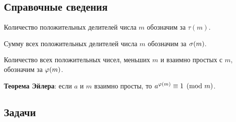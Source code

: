 
\subsection*{Справочные сведения}

Количество положительных делителей числа $m$ обозначим за $\tau(m)$.

Сумму всех положительных делителей числа $m$ обозначим за $\sigma(m)$.

Количество всех положительных чисел, меньших $m$ и взаимно простых с $m$, обозначим за $\varphi(m)$.

\textbf{Теорема Эйлера}: если $a$ и $m$ взаимно просты, то $a^{\varphi(m)}\equiv 1\pmod m$.


\subsection*{Задачи}

